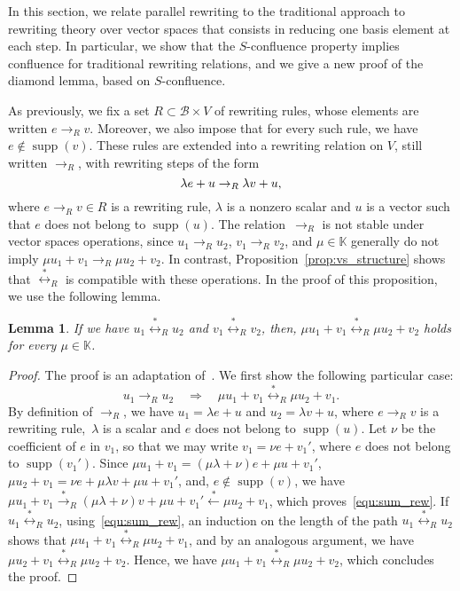\documentclass[11pt]{article}
\newtheorem{lemma}[theorem]{Lemma}
\theoremstyle{definition}
\newcommand\basis{\mathscr{B}}
\DeclareMathOperator{\supp}{supp}
\newcommand\K{\mathbb{K}}
\newcommand\rewR{\to_R}
\newcommand\transR{\overset{*}{\to}_R}
\newcommand\equivR{\overset{*}{\leftrightarrow}_R}
\begin{document}
In this section, we relate parallel rewriting to the traditional approach
to rewriting theory over vector spaces that consists in reducing one
basis element at each step. In particular, we show that the
$S$-confluence property implies confluence for traditional rewriting
relations, and we give a new proof of the diamond lemma, based on
$S$-confluence.
\medskip

As previously, we fix a set $R\subset\basis\times V$ of rewriting rules,
whose elements are written $e\rewR v$. Moreover, we also impose that for
every such rule, we have $e\notin\supp(v)$. These rules are extended into
a rewriting relation on $V$, still written $\rewR$, with rewriting steps
of the form
\begin{equation*}\label{equ:R_rewriting_step}
  \lambda e+u\rewR\lambda v+u,
  \smallskip
\end{equation*}
where $e\rewR v\in R$ is a rewriting rule, $\lambda$ is a nonzero scalar
and $u$ is a vector such that $e$ does not belong to $\supp(u)$. The
relation~$\rewR$ is not stable under vector spaces operations, since
$u_1\rewR u_2$, $v_1\rewR v_2$, and $\mu\in\K$ generally do not imply
$\mu u_1+v_1\rewR \mu u_2+v_2$. In contrast,
Proposition~\ref{prop:vs_structure} shows that $\equivR$ is compatible
with these operations. In the proof of this proposition, we use the
following lemma.
\smallskip

\begin{lemma}\label{lem:butterfly}
  If we have $u_1\equivR u_2$ and $v_1\equivR v_2$, then,
  $\mu u_1+v_1\equivR\mu u_2+v_2$ holds for every $\mu\in\K$.
\end{lemma}

\begin{proof}
  The proof is an adaptation
  of~\cite[Lemma 3.1.3]{GuiraudHoffbeckMalbos19}. We first show the
  following particular case:
  \begin{equation}\label{equ:sum_rew}
    u_1\rewR u_2\quad\Rightarrow\quad\mu u_1+v_1\equivR\mu u_2+v_1.
  \end{equation}
  By
  definition of $\rewR$, we have $u_1=\lambda e+u$ and $u_2=\lambda v+u$,
  where $e\rewR v$ is a rewriting rule,~$\lambda$ is a scalar and $e$
  does not belong to $\supp(u)$. Let $\nu$ be the coefficient of $e$ in
  $v_1$, so that we may write $v_1=\nu e+v_1'$, where $e$ does not belong
  to $\supp(v_1')$. Since $\mu u_1+v_1=(\mu\lambda+\nu)e+\mu u+v_1'$,
  $\mu u_2+v_1=\nu e+\mu\lambda v +\mu u+v_1'$, and, $e\notin\supp(v)$,
  we have $\mu u_1+v_1\transR(\mu\lambda+\nu)v+\mu u+v_1'
  \overset{*}{\leftarrow}\mu u_2+v_1$, which proves~\eqref{equ:sum_rew}.
  If $u_1\equivR u_2$, using~\eqref{equ:sum_rew}, an induction on the
  length of the path $u_1\equivR u_2$ shows that
  $\mu u_1+v_1\equivR\mu u_2+v_1$, and by an analogous argument, we have
  $\mu u_2+v_1\equivR\mu u_2+v_2$. Hence, we have
  $\mu u_1+v_1\equivR\mu u_2+v_2$, which concludes the proof.
\end{proof}
\smallskip
\end{document}
